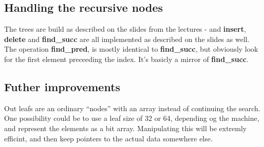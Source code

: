 \subsection*{Handling the recursive nodes}
The trees are build as described on the slides from the lectures - and \textbf{insert}, \textbf{delete} and \textbf{find\_succ} are all implemented as described on the slides as well. The operation \textbf{find\_pred}, is mostly identical to \textbf{find\_succ}, but obviously look for the first element preceeding the index. It's basicly a mirror of \textbf{find\_succ}.

\subsection*{Futher improvements}
Out leafs are an ordinary ``nodes'' with an array instead of continuing the search. One possibility could be to use a leaf size of 32 or 64, depending og the machine, and represent the elements as a bit array. Manipulating this will be extremly efficint, and then keep pointers to the actual data somewhere else.